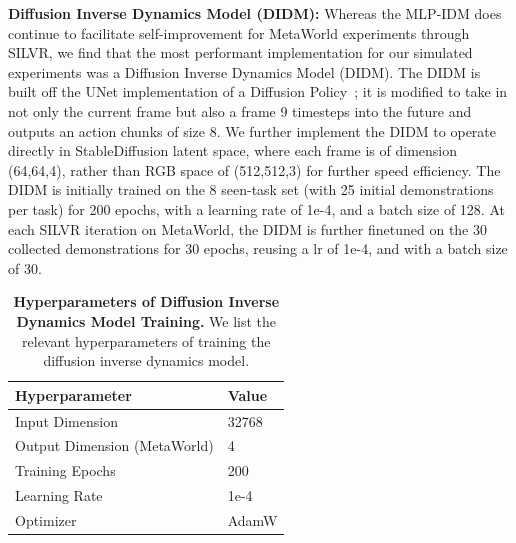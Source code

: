 \textbf{Diffusion Inverse Dynamics Model (DIDM):} Whereas the MLP-IDM does continue to facilitate self-improvement for MetaWorld experiments through SILVR, we find that the most performant implementation for our simulated experiments was a Diffusion Inverse Dynamics Model (DIDM).  The DIDM is built off the UNet implementation of a Diffusion Policy~\citep{chi2023diffusionpolicy}; it is modified to take in not only the current frame but also a frame 9 timesteps into the future and outputs an action chunks of size 8.  We further implement the DIDM to operate directly in StableDiffusion latent space, where each frame is of dimension (64,64,4), rather than RGB space of (512,512,3) for further speed efficiency.  The DIDM is initially trained on the 8 seen-task set (with 25 initial demonstrations per task) for 200 epochs, with a learning rate of 1e-4, and a batch size of 128.  At each SILVR iteration on MetaWorld, the DIDM is further finetuned on the 30 collected demonstrations for 30 epochs, reusing a lr of 1e-4, and with a batch size of 30.

\begin{table}[ht]
\centering
\small

\begin{tabular}{@{}ll@{}}
\toprule
Hyperparameter    & Value \\ \midrule
Input Dimension  & 32768      \\
Output Dimension (MetaWorld) & 4      \\
Training Epochs  & 200      \\
Learning Rate    & 1e-4      \\
Optimizer        & AdamW     \\ \bottomrule
\end{tabular}

\vspace{1em}
\caption{\textbf{Hyperparameters of Diffusion Inverse Dynamics Model Training.}  We list the relevant hyperparameters of training the diffusion inverse dynamics model.}
\label{table:diff_dyn_hparams}
\end{table}


